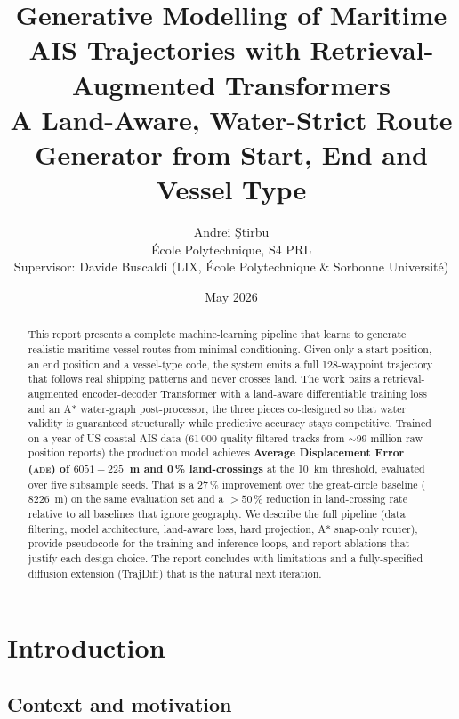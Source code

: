 \documentclass[11pt,a4paper]{article}
\title{\Large\textbf{Generative Modelling of Maritime AIS Trajectories with
        Retrieval-Augmented Transformers}\\[0.6em]
       \large A Land-Aware, Water-Strict Route Generator from
              Start, End and Vessel Type}
\author{Andrei \c{S}tirbu\\[0.3em]
        \normalsize \'Ecole Polytechnique, S4 PRL\\[0.2em]
        \normalsize Supervisor: Davide Buscaldi
                    (LIX, \'Ecole Polytechnique \& Sorbonne Universit\'e)}
\date{May 2026}
\newcommand{\ade}{\textsc{ade}}
\begin{document}
\maketitle
\thispagestyle{empty}

\begin{abstract}
\noindent
This report presents a complete machine-learning pipeline that learns to
generate realistic maritime vessel routes from minimal conditioning.
Given only a start position, an end position and a vessel-type code, the
system emits a full 128-waypoint trajectory that follows real shipping
patterns and never crosses land.
The work pairs a retrieval-augmented encoder-decoder Transformer with a
land-aware differentiable training loss and an A* water-graph
post-processor, the three pieces co-designed so that water validity is
guaranteed structurally while predictive accuracy stays competitive.
Trained on a year of US-coastal AIS data (61\,000 quality-filtered tracks
from $\sim$99 million raw position reports) the production model achieves
\textbf{Average Displacement Error (\ade) of $6051 \pm 225$~m and 0\,\%
land-crossings} at the 10~km threshold, evaluated over five subsample
seeds.
That is a 27\,\% improvement over the great-circle baseline ($8226$~m)
on the same evaluation set and a $> 50\,\%$ reduction in land-crossing
rate relative to all baselines that ignore geography.
We describe the full pipeline (data filtering, model architecture,
land-aware loss, hard projection, A* snap-only router), provide
pseudocode for the training and inference loops, and report ablations
that justify each design choice.
The report concludes with limitations and a fully-specified diffusion
extension (TrajDiff) that is the natural next iteration.
\end{abstract}

\tableofcontents
\newpage

\section{Introduction}\label{sec:intro}

\subsection{Context and motivation}
\end{document}
